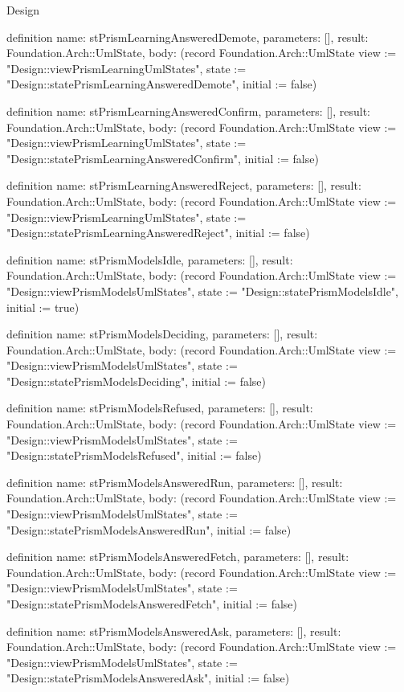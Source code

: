\begin{lexlean}{Design}
\begin{semanticmodule}
definition{
  name: stPrismLearningAnsweredDemote,
  parameters: [],
  result: Foundation.Arch::UmlState,
  body: (record Foundation.Arch::UmlState {view := "Design::viewPrismLearningUmlStates", state := "Design::statePrismLearningAnsweredDemote", initial := false})
}

definition{
  name: stPrismLearningAnsweredConfirm,
  parameters: [],
  result: Foundation.Arch::UmlState,
  body: (record Foundation.Arch::UmlState {view := "Design::viewPrismLearningUmlStates", state := "Design::statePrismLearningAnsweredConfirm", initial := false})
}

definition{
  name: stPrismLearningAnsweredReject,
  parameters: [],
  result: Foundation.Arch::UmlState,
  body: (record Foundation.Arch::UmlState {view := "Design::viewPrismLearningUmlStates", state := "Design::statePrismLearningAnsweredReject", initial := false})
}

definition{
  name: stPrismModelsIdle,
  parameters: [],
  result: Foundation.Arch::UmlState,
  body: (record Foundation.Arch::UmlState {view := "Design::viewPrismModelsUmlStates", state := "Design::statePrismModelsIdle", initial := true})
}

definition{
  name: stPrismModelsDeciding,
  parameters: [],
  result: Foundation.Arch::UmlState,
  body: (record Foundation.Arch::UmlState {view := "Design::viewPrismModelsUmlStates", state := "Design::statePrismModelsDeciding", initial := false})
}

definition{
  name: stPrismModelsRefused,
  parameters: [],
  result: Foundation.Arch::UmlState,
  body: (record Foundation.Arch::UmlState {view := "Design::viewPrismModelsUmlStates", state := "Design::statePrismModelsRefused", initial := false})
}

definition{
  name: stPrismModelsAnsweredRun,
  parameters: [],
  result: Foundation.Arch::UmlState,
  body: (record Foundation.Arch::UmlState {view := "Design::viewPrismModelsUmlStates", state := "Design::statePrismModelsAnsweredRun", initial := false})
}

definition{
  name: stPrismModelsAnsweredFetch,
  parameters: [],
  result: Foundation.Arch::UmlState,
  body: (record Foundation.Arch::UmlState {view := "Design::viewPrismModelsUmlStates", state := "Design::statePrismModelsAnsweredFetch", initial := false})
}

definition{
  name: stPrismModelsAnsweredAsk,
  parameters: [],
  result: Foundation.Arch::UmlState,
  body: (record Foundation.Arch::UmlState {view := "Design::viewPrismModelsUmlStates", state := "Design::statePrismModelsAnsweredAsk", initial := false})
}


\end{semanticmodule}
\end{lexlean}
